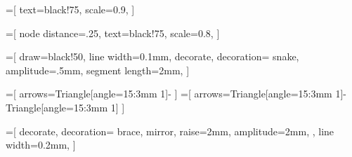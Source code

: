 =[
  text=black!75,
  scale=0.9,
]

=[
  node distance=.25,
  text=black!75,
  scale=0.8,
]

=[
  draw=black!50,
  line width=0.1mm,
  decorate,
  decoration={
    snake,
    amplitude=.5mm,
    segment length=2mm,
  }
]

=[
  arrows={Triangle[angle=15:3mm 1]-}
]
=[
  arrows={Triangle[angle=15:3mm 1]-Triangle[angle=15:3mm 1]}
]
% 
% 
% 
\newcommand{\measure}[4][1ex] {
  \begin{scope}
    \tikzstyle{every path}=[line width=0.1mm]
    \draw (#3) -- ++(0, #1) +(0, 1.5mm) -- +(0, -1.5mm);
    \draw (#4) -- ++(0, #1) +(0, 1.5mm) -- +(0, -1.5mm);
    \draw ($ (#3) + (0, #1) $) [double measure] -- node [above] {#2} ($ (#4) + (0, #1) $);
  \end{scope}
}
\newcommand{\rightmeasure}[4][1ex] {
  \begin{scope}
    \tikzstyle{every path}=[line width=0.1mm]
    \draw (#3) -- ++(0, #1) +(0, 1.5mm) -- +(0, -1.5mm);
    \draw (#4) -- ++(0, #1) +(0, 1.5mm) -- +(0, -1.5mm);
    \draw (#3) ++(0, #1) [inverse measure] -- +(-6mm, 0);
    \draw (#4) ++(0, #1) [inverse measure] -- node [above, pos=.6] {#2} +(12mm, 0);
  \end{scope}
}

=[
  decorate,
  decoration={
    brace,
    mirror,
    raise=2mm,
    amplitude=2mm,
  },
  line width=0.2mm,
]

\newcommand{\topbrace}[3][lastbracepoint] {
  \draw ([xshift=0.5mm] #2) [brace, decoration={mirror=false}] -- ([xshift=-0.5mm] #3);
  \coordinate (#1) at ($ ($ (#2)!.5!(#3) $) + (0, 4mm) $);
}

\newcommand{\bottombrace}[3][lastbracepoint] {
  \draw ([xshift=0.5mm] #2) [brace] -- ([xshift=-0.5mm] #3);
  \coordinate (#1) at ($ ($ (#2)!.5!(#3) $) - (0, 4mm) $);
}

